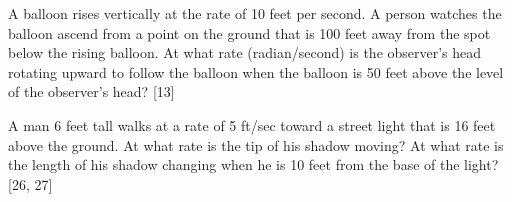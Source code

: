 \begin{questions}
    
    \question A balloon rises vertically at the rate of 10 feet per second.  A person watches the balloon ascend from a point on the ground that is 100 feet away from the spot below the rising balloon.  At what rate (radian/second) is the observer’s head rotating upward to follow the balloon when the balloon is 50 feet above the level of the observer’s head?  [13]
    
    \question A man 6 feet tall walks at a rate of 5 ft/sec toward a street light that is 16 feet above the ground.  At what rate is the tip of his shadow moving?  At what rate is the length of his shadow changing when he is 10 feet from the base of the light? [26, 27]
    
    
    
\end{questions}






\newpage
